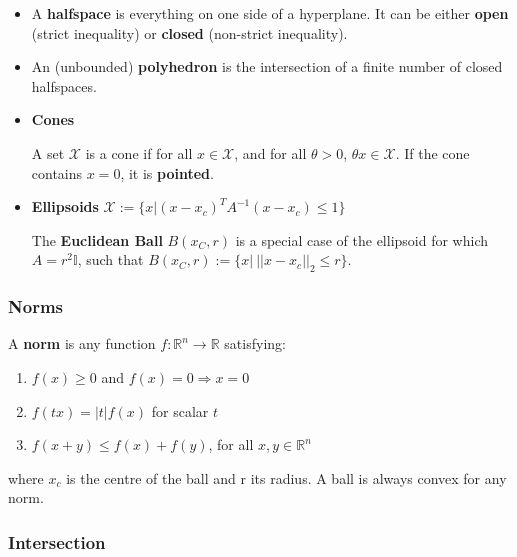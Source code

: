 \documentclass[8pt,a4paper]{scrartcl}
\begin{document}
\begin{multicols*}{3}
\begin{itemize}
\item A \textbf{halfspace} is everything on one side of a hyperplane. It can be either \textbf{open} (strict inequality) or \textbf{closed} (non-strict inequality).

\item An (unbounded) \textbf{polyhedron} is the intersection of a finite number of closed halfspaces.


\item \textbf{Cones} 

 A set $\mathcal{X}$ is a cone if for all $x\in\mathcal{X}$, and for all $\theta>0$, $\theta x\in\mathcal{X}$. If the cone contains $x=0$, it is \textbf{pointed}.

\item \textbf{Ellipsoids} $\mathcal{X}:=\{x|(x-x_c)^TA^{-1}(x-x_c)\leq 1\}$


The \textbf{Euclidean Ball} $B(x_C,r)$ is a special case of the ellipsoid for which $A=r^2 \mathbb{I}$, such that $B(x_C,r):=\{x|\ ||x-x_c||_2\leq r\}$.

\end{itemize}

\subsubsection{Norms}
A \textbf{norm} is any function $f:\mathbb{R}^n\rightarrow \mathbb{R}$ satisfying:

\begin{enumerate}
\ncompaq
\item $f(x)\geq 0$ and $f(x)=0\Rightarrow x=0$
\item $f(tx)=|t|f(x)$ for scalar $t$
\item $f(x+y)\leq f(x)+f(y)$, for all $x,y\in\mathbb{R}^n$
\end{enumerate}



where $x_c$ is the centre of the ball and r its radius. A ball is always convex for any norm.

\subsubsection{Intersection}


\end{multicols*}
\end{document}
